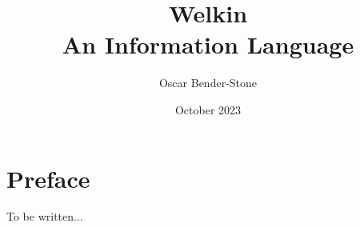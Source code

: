 \documentclass[leqno]{book}
\title{Welkin \\
  An Information Language}
\author{Oscar Bender-Stone}
\date{October 2023}
\begin{document}
\maketitle


\chapter*{Preface}

To be written...

\mainmatter






\end{document}
